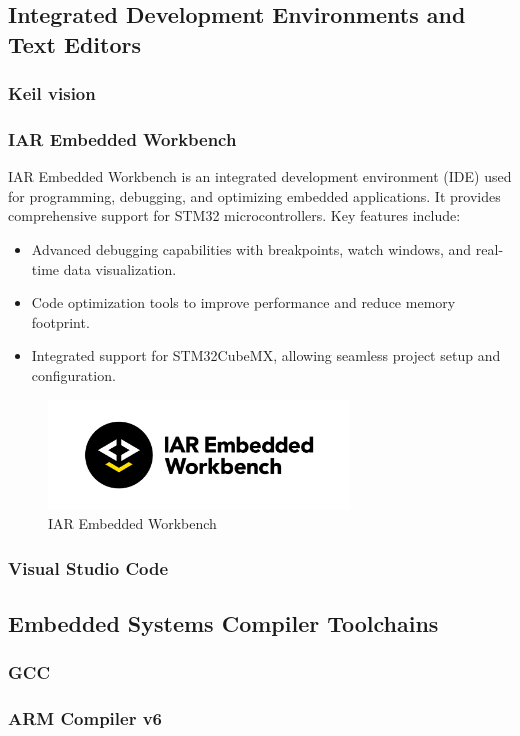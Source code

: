 \subsection*{Integrated Development Environments and Text Editors}
\subsubsection{Keil \textmu vision}
\subsubsection{IAR Embedded Workbench}
IAR Embedded Workbench is an integrated development environment (IDE) used for programming, debugging, and optimizing embedded applications. It provides comprehensive support for STM32 microcontrollers. Key features include:
\begin{itemize}
    \item Advanced debugging capabilities with breakpoints, watch windows, and real-time data visualization.
    \item Code optimization tools to improve performance and reduce memory footprint.
    \item Integrated support for STM32CubeMX, allowing seamless project setup and configuration.
\end{itemize}
\begin{figure}[H]
  \centering
  \includegraphics[width=8cm]{img/IAR.png}
  \caption{IAR Embedded Workbench}
  \label{fig:IAR}
\end{figure}
\subsubsection{Visual Studio Code}
\subsection*{Embedded Systems Compiler Toolchains}
\subsubsection{GCC}
\subsubsection{ARM Compiler v6}
